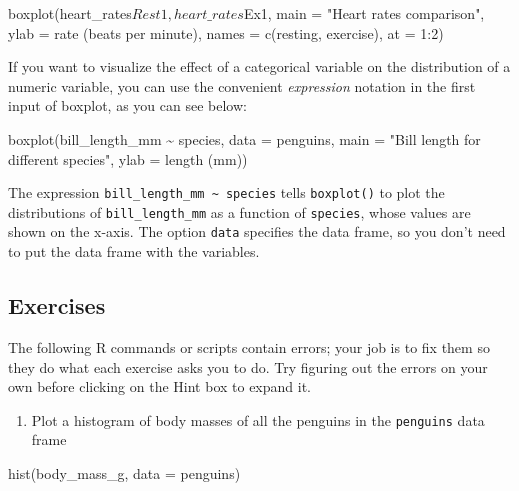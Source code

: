 \documentclass[
  letterpaper,
  DIV=11,
  numbers=noendperiod]{scrreprt}
\newenvironment{Shaded}{\begin{snugshade}}{\end{snugshade}}
\newcommand{\NormalTok}[1]{\textcolor[rgb]{0.00,0.23,0.31}{#1}}
\providecommand{\tightlist}{%
  \setlength{\itemsep}{0pt}\setlength{\parskip}{0pt}}\usepackage{longtable,booktabs,array}
\begin{document}
\begin{Shaded}
\begin{Highlighting}[]
\NormalTok{boxplot(heart\_rates$Rest1, heart\_rates$Ex1, main = "Heart rates comparison", ylab = \textquotesingle{}rate (beats per minute)\textquotesingle{}, names = c(\textquotesingle{}resting\textquotesingle{}, \textquotesingle{}exercise\textquotesingle{}), at = 1:2)}
\end{Highlighting}
\end{Shaded}

If you want to visualize the effect of a categorical variable on the
distribution of a numeric variable, you can use the convenient
\emph{expression} notation in the first input of boxplot, as you can see
below:

\begin{Shaded}
\begin{Highlighting}[]
\NormalTok{boxplot(bill\_length\_mm \textasciitilde{} species, data = penguins, main = "Bill length for different species", ylab = \textquotesingle{}length (mm)\textquotesingle{})}
\end{Highlighting}
\end{Shaded}

The expression \texttt{bill\_length\_mm\ \textasciitilde{}\ species}
tells \texttt{boxplot()} to plot the distributions of
\texttt{bill\_length\_mm} as a function of \texttt{species}, whose
values are shown on the x-axis. The option \texttt{data} specifies the
data frame, so you don't need to put the data frame with the variables.

\hypertarget{exercises-11}{%
\subsection*{Exercises}\label{exercises-11}}

The following R commands or scripts contain errors; your job is to fix
them so they do what each exercise asks you to do. Try figuring out the
errors on your own before clicking on the Hint box to expand it.

\begin{enumerate}
\def\labelenumi{\arabic{enumi}.}
\tightlist
\item
  Plot a histogram of body masses of all the penguins in the
  \texttt{penguins} data frame
\end{enumerate}

\begin{Shaded}
\begin{Highlighting}[]
\NormalTok{hist(body\_mass\_g, data = penguins)}
\end{Highlighting}
\end{Shaded}
\end{document}
